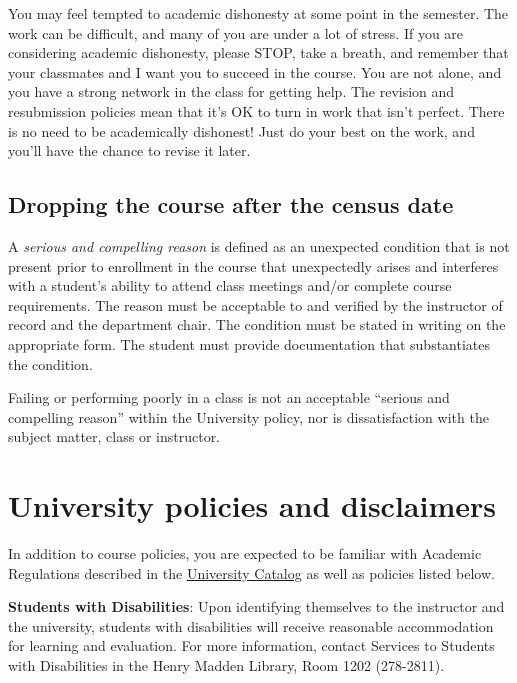 You may feel tempted to academic dishonesty at some point in the
semester. The work can be difficult, and many of you are under a lot of
stress. If you are considering academic dishonesty, please STOP, take a
breath, and remember that your classmates and I want you to succeed in
the course. You are not alone, and you have a strong network in the
class for getting help. The revision and resubmission policies mean that
it's OK to turn in work that isn't perfect. There is no need to be
academically dishonest! Just do your best on the work, and you'll have
the chance to revise it later.

\hypertarget{dropping-the-course-after-the-census-date}{%
\subsection{Dropping the course after the census
date}\label{dropping-the-course-after-the-census-date}}

A \emph{serious and compelling reason} is defined as an unexpected
condition that is not present prior to enrollment in the course that
unexpectedly arises and interferes with a student's ability to attend
class meetings and/or complete course requirements. The reason must be
acceptable to and verified by the instructor of record and the
department chair. The condition must be stated in writing on the
appropriate form. The student must provide documentation that
substantiates the condition.

Failing or performing poorly in a class is not an acceptable ``serious
and compelling reason'' within the University policy, nor is
dissatisfaction with the subject matter, class or instructor.

\hypertarget{university-policies-and-disclaimers}{%
\section{University policies and
disclaimers}\label{university-policies-and-disclaimers}}

In addition to course policies, you are expected to be familiar with
Academic Regulations described in the
\href{http://www.fresnostate.edu/catalog/academic-regulations/}{University
Catalog} as well as policies listed below.

\textbf{Students with Disabilities}: Upon identifying themselves to the
instructor and the university, students with disabilities will receive
reasonable accommodation for learning and evaluation. For more
information, contact Services to Students with Disabilities in the Henry
Madden Library, Room 1202 (278-2811).


